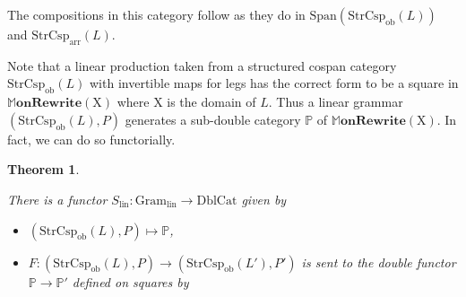 \documentclass{amsart}
\newcommand{\ob}{_{ \text{ob} }}
\newcommand{\arr}{_{ \text{arr} }}
\newcommand{\lin}{_{\t{lin}}}
\newcommand{\X}{\cat{X}}
\newcommand{\PPP}{\dblcat{P}}
\newcommand{\DblCat}{\cat{DblCat}}
\newcommand{\Gram}{\cat{Gram}}
\newcommand{\Span}[1]{\cat{Span}(#1)}
\newcommand{\StrCsp}{\cat{StrCsp}}
\newcommand{\MMMonRewrite}{\dblcat{M}\bicat{onRewrite}}
\newcommand{\cat}[1]{\mathrm{#1}}
\newcommand{\bicat}[1]{\mathbf{#1}}
\newcommand{\dblcat}[1]{\mathbb{#1}}
\renewcommand{\t}[1]{\text{#1}}
\newcommand{\from}{\colon}
\newtheorem{theorem}{Theorem}[section]
\theoremstyle{remark}
\theoremstyle{definition}
\begin{document}
The compositions in this category follow as they do in
%
\(
  \Span{\StrCsp\ob (L)}
\)
% 
and
%
\(
  \StrCsp\arr (L).
\)

Note that a linear production taken from a structured cospan category
$ \StrCsp\ob (L) $ with invertible maps for legs has the correct form to
be a square in
%
\(
  \MMMonRewrite ( \X )
\)
% 
where $ \X $ is the domain of $ L $.  Thus a linear grammar
$ ( \StrCsp\ob (L) , P ) $ generates a sub-double category $ \PPP $ of
%
\(
  \MMMonRewrite ( \X ).
\)
%
In fact, we can do so functorially.

\begin{theorem} \label{thm:s-lin-functor}

  There is a functor $ S\lin \from \Gram\lin \to \DblCat $ given by
  \begin{itemize}
  \item $ ( \StrCsp\ob (L) , P ) \mapsto \PPP $,
  \item
    \(
      F \from
      ( \StrCsp\ob (L) , P ) \to ( \StrCsp\ob (L') , P' ) 
    \)
    is sent to the double functor $ \PPP \to \PPP' $ defined on
    squares by



\end{itemize}
\end{theorem}
\end{document}
